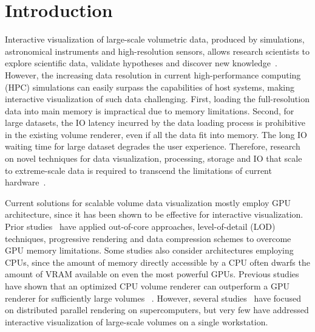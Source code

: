 


\maketitle

\section{Introduction}
\label{sec:introduction}
Interactive visualization of large-scale volumetric data, produced by
simulations, astronomical instruments and high-resolution sensors, 
allows research scientists to explore scientific data, validate
hypotheses and discover new knowledge~\cite{keim2013big}. 
However, the increasing data resolution in current high-performance
computing (HPC) simulations can easily surpass the capabilities of
host systems, making interactive visualization of such data challenging. 
First, loading the full-resolution data into main memory is impractical
due to memory limitations. Second, for large datasets, the IO latency incurred by the data 
loading process is prohibitive in the existing volume renderer,
even if all the data fit into memory.
The long IO waiting time for large dataset degrades the user experience.
Therefore, research on novel techniques for
data visualization, processing, storage and IO that scale to 
extreme-scale data is required to transcend the limitations
of current hardware~\cite{beyer2014survey}.



Current solutions for scalable volume data visualization mostly employ GPU architecture,
since it has been shown to be effective for interactive visualization. 
Prior studies~\cite{crassin2009gigavoxels,engel2011cera,hadwiger2008interactive} 
have applied out-of-core approaches, level-of-detail (LOD) techniques,
progressive rendering and data compression schemes to overcome GPU memory limitations. 
Some studies also consider architectures employing CPUs, since the amount 
of memory directly accessible by a CPU often dwarfs the amount of VRAM available on even
the most powerful GPUs. Previous studies have shown that an optimized CPU volume renderer 
can outperform a GPU renderer for sufficiently large volumes ~\cite{smelyanskiy2009,knoll2011full,wald2017ospray}. However, several studies~\cite{childs2006scalable,peterka2008parallel,howison2012hybrid}
have focused on distributed parallel rendering on supercomputers, but very few have addressed interactive visualization of large-scale volumes on a single workstation.



